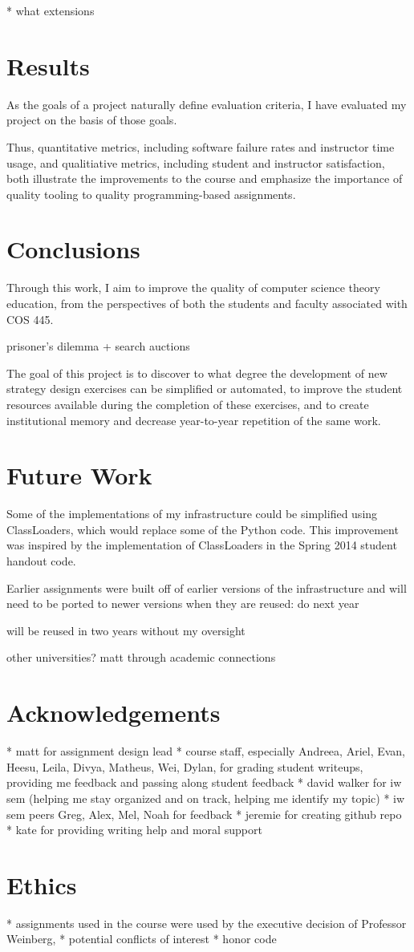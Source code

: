 \documentclass[pageno]{jpaper}
\begin{document}
* what extensions

\section*{Results}
As the goals of a project naturally define evaluation criteria, I have evaluated my project on the basis of those goals.

Thus, quantitative metrics, including software failure rates and instructor time usage, and qualitiative metrics, including student and instructor satisfaction, both illustrate the improvements to the course and emphasize the importance of quality tooling to quality programming-based assignments.

\section*{Conclusions}
Through this work, I aim to improve the quality of computer science theory education, from the perspectives of both the students and faculty associated with COS 445.

prisoner's dilemma + search auctions

The goal of this project is to discover to what degree the development of new strategy design exercises can be simplified or automated, to improve the student resources available during the completion of these exercises, and to create institutional memory and decrease year-to-year repetition of the same work.


\section*{Future Work}

Some of the implementations of my infrastructure could be simplified using ClassLoaders, which would replace some of the Python code.
This improvement was inspired by the implementation of ClassLoaders in the Spring 2014 student handout code.

Earlier assignments were built off of earlier versions of the infrastructure and will need to be ported to newer versions when they are reused: do next year

will be reused in two years without my oversight

other universities? matt through academic connections

\section*{Acknowledgements}
* matt for assignment design lead
* course staff, especially Andreea, Ariel, Evan, Heesu, Leila, Divya, Matheus, Wei, Dylan, for grading student writeups, providing me feedback and passing along student feedback
* david walker for iw sem (helping me stay organized and on track, helping me identify my topic)
* iw sem peers Greg, Alex, Mel, Noah for feedback
* jeremie for creating github repo
* kate for providing writing help and moral support

\section*{Ethics}
* assignments used in the course were used by the executive decision of Professor Weinberg,
* potential conflicts of interest
* honor code
\end{document}
